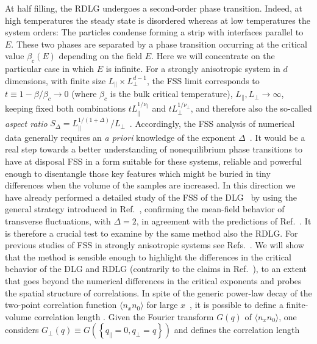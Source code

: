 \documentclass[aps,prl,twocolumn,floatfix,amssymb,showpacs]{revtex4}
\newcommand{\pe}[1]{#1_{\bot}}
\newcommand{\pa}[1]{#1_{\|}}
\begin{document}
  At half filling, the RDLG undergoes a second-order phase transition. Indeed, 
  at high temperatures the steady state is disordered whereas at low 
  temperatures the system orders: The particles condense forming a strip 
  with interfaces parallel to $E$. 
  These two phases are separated by a phase transition 
  occurring at the critical value $\beta_c(E)$ depending on the field $E$. 
  Here we will concentrate on the particular case in which $E$ is infinite.
  For a strongly anisotropic system in $d$ dimensions, with finite size
  $\pa{L}\times\pe{L}^{d-1}$, the FSS limit corresponds to 
  $t\equiv 1-\beta/\beta_{c}\to 0$ (where $\beta_c$ is the bulk critical
  temperature), $\pa{L},\pe{L}\to\infty$, keeping fixed both
  combinations $t\pa{L}^{1/\pa{\nu}}$ and $t\pe{L}^{1/\pe{\nu}}$, and
  therefore also the so-called {\em aspect ratio} $S_{\Delta}=
  \pa{L}^{1/(1+\Delta)}/\pe{L}$~\cite{Binder}. 
  Accordingly, the FSS analysis of numerical data generally requires an
  {\it a priori} knowledge of the exponent $\Delta$~\cite{our}.
  It would be a real step towards a better understanding of
  nonequilibrium phase transitions to have at disposal FSS in a form
  suitable for these systems, reliable and powerful enough to disentangle
  those key features which might be buried in tiny differences when the
  volume of the samples are increased.
  In this direction we have already performed a detailed study of the
  FSS of the DLG~\cite{noi} by using the general strategy
  introduced in Ref.~\cite{Caracciolo},
  confirming the mean-field behavior of transverse
  fluctuations, with $\Delta=2$, in agreement with the predictions 
  of Ref.~\cite{Janssen86a}. 
  It is therefore a crucial test to examine by the same method also the
  RDLG.
  For previous studies of FSS in strongly anisotropic systems
  see Refs.~\cite{Binder,Leung92}.
  We will show that the method is sensible enough to highlight the
  differences in the critical behavior of the DLG and RDLG (contrarily to the
  claims in Ref.~\cite{Albano-comment}), to an extent
  that goes beyond the numerical differences in the critical exponents
  and probes the spatial structure of correlations.
  In spite of the generic power-law decay 
  of the two-point correlation function $\langle n_x n_0\rangle$ for large
  $x$~\cite{two-reservoirs},
  it is possible to define a finite-volume correlation length \cite{noi}.
  Given the Fourier transform $G(q)$ of $\langle n_x n_0\rangle$, 
  one considers 
  $\pe{G}(q) \equiv G(\left\{\pa{q}=0,\pe{q}=q\right\})$ 
  and defines the correlation length
\end{document}
